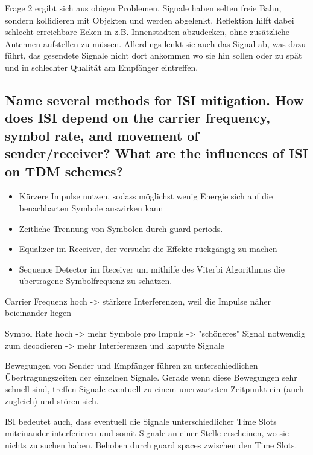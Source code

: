 Frage 2 ergibt sich aus obigen Problemen. Signale haben selten freie Bahn, sondern kollidieren mit Objekten und werden abgelenkt.
Reflektion hilft dabei schlecht erreichbare Ecken in z.B. Innenstädten abzudecken, ohne zusätzliche Antennen aufstellen zu müssen. Allerdings lenkt sie auch das Signal ab, was dazu führt, das gesendete Signale nicht dort ankommen wo sie hin sollen oder zu spät und in schlechter Qualität am Empfänger eintreffen.

\subsection{Name several methods for ISI mitigation. How does ISI depend on the carrier
frequency, symbol rate, and movement of sender/receiver? What are the influences
of ISI on TDM schemes?}

\begin{itemize}

\item Kürzere Impulse nutzen, sodass möglichst wenig Energie sich auf die benachbarten Symbole auswirken kann

\item Zeitliche Trennung von Symbolen durch guard-periods. 

\item Equalizer im Receiver, der versucht die Effekte rückgängig zu machen

\item Sequence Detector im Receiver um mithilfe des Viterbi Algorithmus die übertragene Symbolfrequenz zu schätzen.

\end{itemize}

Carrier Frequenz hoch -> stärkere Interferenzen, weil die Impulse näher beieinander liegen

Symbol Rate hoch -> mehr Symbole pro Impuls -> "schöneres" Signal notwendig zum decodieren -> mehr Interferenzen und kaputte Signale

Bewegungen von Sender und Empfänger führen zu unterschiedlichen Übertragungszeiten der einzelnen Signale. Gerade wenn diese Bewegungen sehr schnell sind, treffen Signale eventuell zu einem unerwarteten Zeitpunkt ein (auch zugleich) und stören sich.

ISI bedeutet auch, dass eventuell die Signale unterschiedlicher Time Slots miteinander interferieren und somit Signale an einer Stelle erscheinen, wo sie nichts zu suchen haben. Behoben durch guard spaces zwischen den Time Slots.



